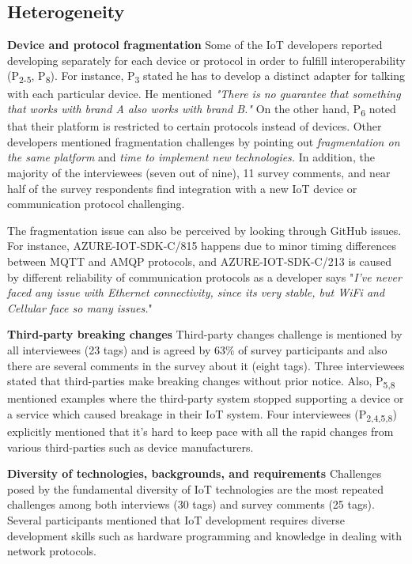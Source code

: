 {\subsection{Heterogeneity}
\textbf{Device and protocol fragmentation} Some of the IoT developers reported developing separately for each device or protocol in order to fulfill interoperability (P\textsubscript{2-5}, P\textsubscript{8}). For instance, P\textsubscript{3} stated he has to develop a distinct adapter for talking with each particular device. He mentioned \textit{"There is no guarantee that something that works with brand A also works with brand B."} On the other hand, P\textsubscript{6} noted that their platform is restricted to certain protocols instead of devices. Other developers mentioned fragmentation challenges by pointing out \emph{fragmentation on the same platform} and \emph{time to implement new technologies.} In addition, the majority of the interviewees (seven out of nine), 11 survey comments, and near half of the survey respondents find integration with a new IoT device or communication protocol challenging. 

The fragmentation issue can also be perceived by looking through GitHub issues. For instance, AZURE-IOT-SDK-C/815 happens due to minor timing differences between MQTT and AMQP protocols, and AZURE-IOT-SDK-C/213 is caused by different reliability of communication protocols as a developer says "\emph{I've never faced any issue with Ethernet connectivity, since its very stable, but WiFi and Cellular face so many issues.}"

\textbf{Third-party breaking changes}
Third-party changes challenge is mentioned by all interviewees (23 tags) and is agreed by 63\% of survey participants and also there are several comments in the survey about it (eight tags). Three interviewees stated that third-parties make breaking changes without prior notice. Also, P\textsubscript{5,8} mentioned examples where the third-party system stopped supporting a device or a service which caused breakage in their IoT system. Four interviewees (P\textsubscript{2,4,5,8}) explicitly mentioned that it's hard to keep pace with all the rapid changes from various third-parties such as device manufacturers. 

\textbf{Diversity of technologies, backgrounds, and requirements}
Challenges posed by the fundamental diversity of IoT technologies are the most repeated challenges among both interviews (30 tags) and survey comments (25 tags). Several participants mentioned that IoT development requires diverse development skills such as hardware programming and knowledge in dealing with network protocols.

}
